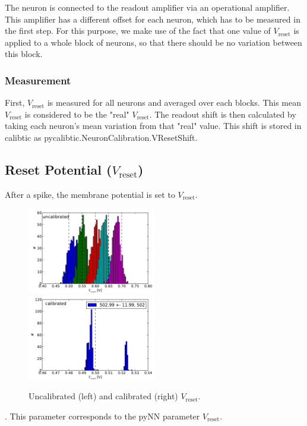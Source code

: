\documentclass[12pt,a4paper,bibliography=totocnumbered,listof=totocnumbered, DIV12]{scrartcl}
\newcommand{\vreset}{\ensuremath{V_{\text{reset}}}}
\begin{document}
The neuron is connected to the readout amplifier via an operational amplifier.
This amplifier has a different offset for each neuron, which has to be measured in the first step.
For this purpose, we make use of the fact that one value of $V_\text{reset}$ is applied to a whole block of neurons, so that there should be no variation between this block.

\subsubsection*{Measurement}

First, $V_\text{reset}$ is measured for all neurons and averaged over each blocks.
This mean $V_\text{reset}$ is considered to be the "real" $V_\text{reset}$.
The readout shift is then calculated by taking each neuron's mean variation from that "real" value.
This shift is stored in calibtic as {pycalibtic.NeuronCalibration.VResetShift}.

\subsection{Reset Potential (\vreset)}



After a spike, the membrane potential is set to \vreset.
\begin{figure}
  \centering
  \includegraphics[width=0.5\textwidth]{figures/V_reset_uncalibrated}%
  \includegraphics[width=0.5\textwidth]{figures/V_reset_calibrated}
  \caption{Uncalibrated (left) and calibrated (right) \vreset.}
  \label{fig:vreset_uncalib_calib}
\end{figure}
.
This parameter corresponds to the pyNN parameter \vreset.
\end{document}
